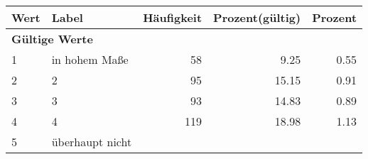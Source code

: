      \begin{longtable}{lXrrr}
     \toprule
     \textbf{Wert} & \textbf{Label} & \textbf{Häufigkeit} & \textbf{Prozent(gültig)} & \textbf{Prozent} \\
     \endhead
     \midrule
     \multicolumn{5}{l}{\textbf{Gültige Werte}}\\

     1 &
     \multicolumn{1}{X}{ in hohem Maße   } &


       \num{58} &
       \num[round-mode=places,round-precision=2]{9,25} &
         \num[round-mode=places,round-precision=2]{0,55} \\

     2 &
     \multicolumn{1}{X}{ 2   } &


       \num{95} &
       \num[round-mode=places,round-precision=2]{15,15} &
         \num[round-mode=places,round-precision=2]{0,91} \\

     3 &
     \multicolumn{1}{X}{ 3   } &


       \num{93} &
       \num[round-mode=places,round-precision=2]{14,83} &
         \num[round-mode=places,round-precision=2]{0,89} \\

     4 &
     \multicolumn{1}{X}{ 4   } &


       \num{119} &
       \num[round-mode=places,round-precision=2]{18,98} &
         \num[round-mode=places,round-precision=2]{1,13} \\

     5 &
     \multicolumn{1}{X}{ überhaupt nicht   } &



\end{longtable}
